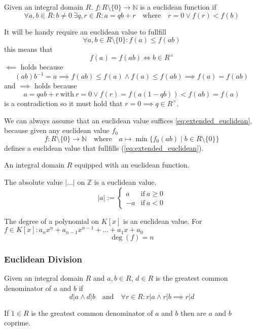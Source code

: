 \begin{definition}
   Given an integral domain \(R\).
   \(f: R \setminus \{0\} \to \mathbb{N}\) is a euclidean function if
   \[\forall a, b \in R: b \neq 0~\exists q, r \in R: a = qb + r \quad\text{where}\quad r = 0 \lor f(r) < f(b)\]
\end{definition}
\begin{remark}
   It will be handy require an euclidean value to fullfill
   \begin{equation}\label{eq:extended_euclidean}
      \forall a,b \in R \setminus \{0\}: f(a) \leq f(ab)
   \end{equation}
   this means that
   \[f(a) = f(ab) \iff b \in R^{\times}\]
   \(\impliedby\) holds because
   \[(ab)b^{-1} = a \implies f(ab) \leq f(a) \land f(a) \leq f(ab) \implies f(a) = f(ab)\]
   and \(\implies\) holds because
   \[a = qab + r~\text{with}~r=0 \lor f(r) = f(a(1-qb)) < f(ab) = f(a)\]
   is a contradiction so it must hold that \(r = 0 \implies q \in R^{\times}\).

   We can always assume that an euclidean value suffices \cref{eq:extended_euclidean}, because given any euclidean value \(f_0\)
   \[f: R \setminus \{0\} \to \mathbb{N} \quad\text{where}\quad a \mapsto \min\{f_0(ab) \mid b \in R \setminus \{0\}\}\]
   defines a euclidean value that fullfills (\ref{eq:extended_euclidean}).
\end{remark}

\begin{definition}
   An integral domain \(R\) equipped with an euclidean function.
\end{definition}

\begin{proposition}
   The absolute value \(|\ldots|\) on \(\mathbb{Z}\) is a euclidean value.
   \[|a| := \begin{cases} a & \text{if}~a \geq 0\\ -a & \text{if}~a < 0\end{cases}\]
\end{proposition}

\begin{proposition}
   The degree of a polynomial on \(K[x]\) is an euclidean value.
   For \(f \in K[x]: a_nx^n + a_{n-1}x^{n-1} + \ldots + a_1x + a_0\)
   \[\deg(f) = n\]
\end{proposition}

\subsubsection{Euclidean Division}
\begin{definition}
   Given an integral domain \(R\) and \(a, b \in R\), \(d \in R\) is the greatest common denominator of \(a\) and \(b\) if
   \[d|a \land d|b \quad\text{and}\quad \forall r \in R: r|a \land r|b \implies r|d\]
\end{definition}
\begin{remark}
   If \(1 \in R\) is the greatest common denominator of \(a\) and \(b\) then are \(a\) and \(b\) coprime.
\end{remark}

